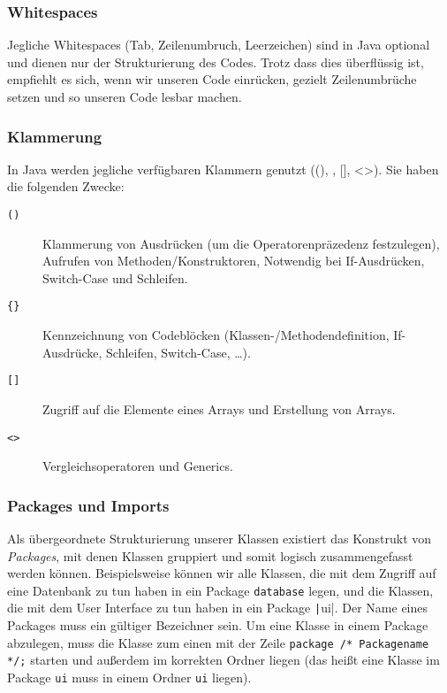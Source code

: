 	\subsubsection{Whitespaces}
		Jegliche Whitespaces (Tab, Zeilenumbruch, Leerzeichen) sind in Java optional und dienen nur der Strukturierung des Codes. Trotz dass dies überflüssig ist, empfiehlt es sich, wenn wir unseren Code einrücken, gezielt Zeilenumbrüche setzen und so unseren Code lesbar machen.
	
	\subsubsection{Klammerung}
		In Java werden jegliche verfügbaren Klammern genutzt ((), {}, [], <>). Sie haben die folgenden Zwecke:
		\begin{description}
			\item[\texttt{()}] Klammerung von Ausdrücken (um die Operatorenpräzedenz festzulegen), Aufrufen von Methoden/Konstruktoren, Notwendig bei If-Ausdrücken, Switch-Case und Schleifen.
			\item[\texttt{\{\}}] Kennzeichnung von Codeblöcken (Klassen-/Methodendefinition, If-Ausdrücke, Schleifen, Switch-Case, \dots).
			\item[\texttt{[]}] Zugriff auf die Elemente eines Arrays und Erstellung von Arrays.
			\item[\texttt{<>}] Vergleichsoperatoren und Generics.
		\end{description}
	
	\subsubsection{Packages und Imports}
		Als übergeordnete Strukturierung unserer Klassen existiert das Konstrukt von \textit{Packages}, mit denen Klassen gruppiert und somit logisch zusammengefasst werden können. Beispielsweise können wir alle Klassen, die mit dem Zugriff auf eine Datenbank zu tun haben in ein Package \texttt{database} legen, und die Klassen, die mit dem User Interface zu tun haben in ein Package \texttt|ui|. Der Name eines Packages muss ein gültiger Bezeichner sein. Um eine Klasse in einem Package abzulegen, muss die Klasse zum einen mit der Zeile \lstinline|package /* Packagename */;| starten und außerdem im korrekten Ordner liegen (das heißt eine Klasse im Package \texttt{ui} muss in einem Ordner \texttt{ui} liegen).
		
